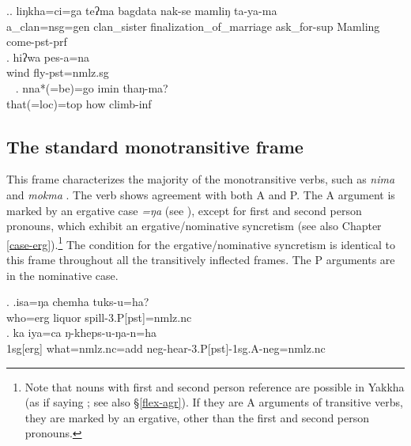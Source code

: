 \ex.\ag. liŋkha=ci=ga teʔma  bagdata nak-se mamliŋ ta-ya-ma\\
	a\_clan{\sc =nsg=gen} clan\_sister finalization\_of\_marriage ask\_for{\sc -sup} Mamling  come{\sc [3sg]-pst-prf}\\
	 
\bg. hiʔwa pes-a=na\\
wind fly{\sc [3sg]-pst=nmlz.sg}\\\
 
\bg. nna*(=be)=go imin thaŋ-ma?\\
that{\sc *(=loc)=top} how climb{\sc -inf} \\
 



\subsection{The standard monotransitive frame}\label{stand-tr}


\noindent
This frame characterizes the majority of the monotransitive verbs, such as \emph{nima}  and  \emph{mokma} . The verb shows agreement with both A and P. The A argument is  marked by an ergative case \emph{=ŋa} (see \Next[a]), except for first and second person pronouns, which exhibit an ergative/nominative syncretism (see also Chapter \ref{case-erg}).\footnote{Note that nouns with first and second person reference are possible in Yakkha (as if saying ; see also §\ref{flex-agr}). If they are A arguments of transitive verbs, they are marked by an ergative, other than the first and second person pronouns.} The condition for the ergative/nominative syncretism is identical to this frame throughout all the transitively inflected frames. The P arguments are in the nominative case. 

 \ex. \ag.isa=ŋa chemha tuks-u=ha?\\
		who{\sc =erg} liquor spill{\sc -3.P[pst]=nmlz.nc}\\
 \bg. ka iya=ca ŋ-kheps-u-ŋa-n=ha\\
  {\sc 1sg[erg]} what{\sc =nmlz.nc=add}  {\sc neg}-hear-{\sc 3.P[pst]-1sg.A-neg=nmlz.nc}\\
 \rede{I did not hear anything.}
 
